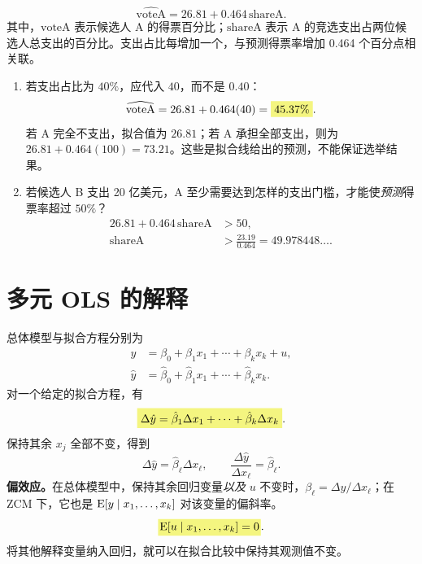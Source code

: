 \begin{exercise}[竞选支出]\label{ex:election}
\[\widehat{\mathrm{voteA}}=26.81+0.464\,\mathrm{shareA}.\]
其中，$\mathrm{voteA}$ 表示候选人 A 的得票百分比；$\mathrm{shareA}$ 表示 A 的竞选支出占两位候选人总支出的百分比。支出占比每增加一个，与预测得票率增加 0.464 个百分点相关联。
\begin{enumerate}
\item 若支出占比为 $40\%$，应代入 $40$，而不是 $0.40$：
\[\widehat{\mathrm{voteA}}=26.81+0.464(40)=\hm{45.37\%}.\]
若 A 完全不支出，拟合值为 $26.81$；若 A 承担全部支出，则为 $26.81+0.464(100)=73.21$。这些是拟合线给出的预测，不能保证选举结果。
\item 若候选人 B 支出 20 亿美元，A 至少需要达到怎样的支出门槛，才能使\emph{预测}得票率超过 $50\%$？
\begin{align*}
26.81+0.464\,\mathrm{shareA}&>50,\\
\mathrm{shareA}&>\frac{23.19}{0.464}=49.978448\ldots.
\end{align*}
\end{enumerate}
\end{exercise}

\section{多元 OLS 的解释}
\label{sec:multiple-interpretation}
总体模型与拟合方程分别为
\begin{align}
y&=\beta_0+\beta_1x_1+\cdots+\beta_kx_k+u,\label{eq:multiple-model}\\
\hat y&=\hat\beta_0+\hat\beta_1x_1+\cdots+\hat\beta_kx_k.\label{eq:multiple-fitted}
\end{align}
对一个给定的拟合方程，有
\[\hm{\Delta\hat y=\hat\beta_1\Delta x_1+\cdots+\hat\beta_k\Delta x_k}.\]
保持其余 $x_j$ 全部不变，得到
\[\Delta\hat y=\hat\beta_\ell\Delta x_\ell,
\qquad\frac{\Delta\hat y}{\Delta x_\ell}=\hat\beta_\ell.
\]
\textbf{偏效应。}在总体模型中，保持其余回归变量\emph{以及} $u$ 不变时，$\beta_\ell=\Delta y/\Delta x_\ell$；在 ZCM 下，它也是 $\operatorname{E}[y\mid x_1,\ldots,x_k]$ 对该变量的偏斜率。
\[\hy{$\E[u\mid x_1,\ldots,x_k]=0$}.\]
将其他解释变量纳入回归，就可以在拟合比较中保持其观测值不变。

